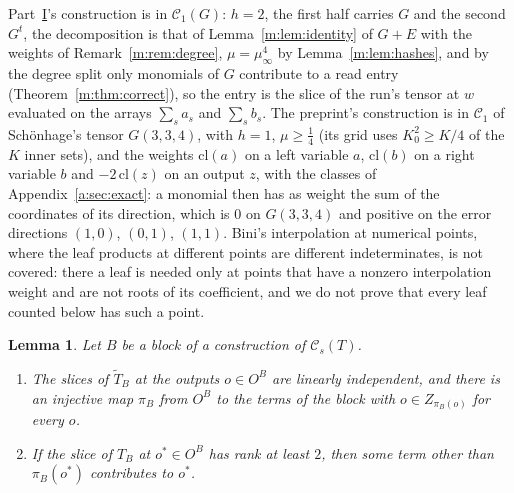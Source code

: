 \documentclass[11pt]{article}
\newtheorem{lemma}[theorem]{Lemma}
\theoremstyle{definition}
\theoremstyle{remark}
\begin{document}
Part~\hyperref[m:partI]{I}'s construction is in $\mathcal C_1(G)$: $h=2$, the first half carries $G$ and the second $G^t$, the decomposition is that of Lemma~\ref{m:lem:identity} of $G+E$ with the weights of Remark~\ref{m:rem:degree}, $\mu=\mu_\infty^4$ by Lemma~\ref{m:lem:hashes}, and by the degree split only monomials of $G$ contribute to a read entry (Theorem~\ref{m:thm:correct}), so the entry is the slice of the run's tensor at $w$ evaluated on the arrays $\sum_sa_s$ and $\sum_sb_s$. The preprint's construction is in $\mathcal C_1$ of Schönhage's tensor $G(3,3,4)$, with $h=1$, $\mu\ge\frac14$ (its grid uses $K_0^2\ge K/4$ of the $K$ inner sets), and the weights $\mathrm{cl}(a)$ on a left variable $a$, $\mathrm{cl}(b)$ on a right variable $b$ and $-2\,\mathrm{cl}(z)$ on an output $z$, with the classes of Appendix~\ref{a:sec:exact}: a monomial then has as weight the sum of the coordinates of its direction, which is $0$ on $G(3,3,4)$ and positive on the error directions $(1,0)$, $(0,1)$, $(1,1)$. Bini's interpolation at numerical points, where the leaf products at different points are different indeterminates, is not covered: there a leaf is needed only at points that have a nonzero interpolation weight and are not roots of its coefficient, and we do not prove that every leaf counted below has such a point.

\begin{lemma}\label{a:lem:hall}
Let $B$ be a block of a construction of $\mathcal C_s(T)$.
\begin{enumerate}[label=(\alph*),nosep]
\item The slices of $\tilde T_B$ at the outputs $o\in O^B$ are linearly independent, and there is an injective map $\pi_B$ from $O^B$ to the terms of the block with $o\in Z_{\pi_B(o)}$ for every $o$.
\item If the slice of $T_B$ at $o^*\in O^B$ has rank at least $2$, then some term other than $\pi_B(o^*)$ contributes to $o^*$.
\end{enumerate}
\end{lemma}
\end{document}
